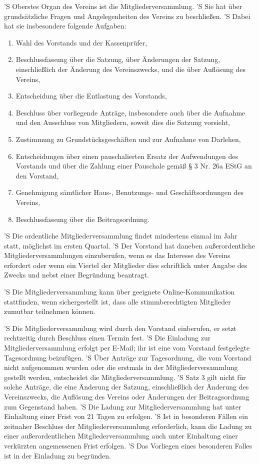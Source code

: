 \documentclass[a4paper,10pt]{scrreprt}
\begin{document}
\begin{contract}

'S Oberstes Organ des Vereins ist die Mitgliederversammlung.
'S Sie hat über grundsätzliche Fragen und Angelegenheiten des Vereins zu
beschließen.
'S Dabei hat sie insbesondere folgende Aufgaben:
\begin{enumerate}
	\item Wahl des Vorstands und der Kassenprüfer,
	\item Beschlussfassung über die Satzung, über Änderungen der Satzung,
	      einschließlich der Änderung des Vereinszwecks, und die über
		  Auflösung des Vereins,
	\item Entscheidung über die Entlastung des Vorstands,
	\item Beschluss über vorliegende Anträge, insbesondere auch über die
	      Aufnahme und den Ausschluss von Mitgliedern, soweit dies die Satzung
		  vorsieht,
	\item Zustimmung zu Grundstücksgeschäften und zur Aufnahme von Darlehen,
	\item Entscheidungen über einen pauschalierten Ersatz der Aufwendungen des
	      Vorstands und über die Zahlung einer Pauschale gemäß § 3 Nr. 26a EStG
		  an den Vorstand,
	\item Genehmigung sämtlicher Haus-, Benutzungs- und Geschäftsordnungen des
	      Vereins,
	\item Beschlussfassung über die Beitragsordnung.
\end{enumerate}

'S Die ordentliche Mitgliederversammlung findet mindestens einmal im Jahr
statt, möglichst im ersten Quartal.
'S Der Vorstand hat daneben außerordentliche Mitgliederversammlungen
einzuberufen, wenn es das Interesse des Vereins erfordert oder wenn ein Viertel
der Mitglieder dies schriftlich unter Angabe des Zwecks und nebst einer
Begründung beantragt.

'S Die Mitgliederversammlung kann über geeignete Online-Kommunikation
stattfinden, wenn sichergestellt ist, dass alle stimmberechtigten Mitglieder
zumutbar teilnehmen können.

'S Die Mitgliederversammlung wird durch den Vorstand einberufen, er setzt
rechtzeitig durch Beschluss einen Termin fest.
'S Die Einladung zur Mitgliederversammlung erfolgt per E-Mail; ihr ist eine vom
Vorstand festgelegte Tagesordnung beizufügen.
'S Über Anträge zur Tagesordnung, die vom Vorstand nicht aufgenommen wurden
oder die erstmals in der Mitgliederversammlung gestellt werden, entscheidet die
Mitgliederversammlung.
'S Satz 3 gilt nicht für solche Anträge, die eine Änderung der Satzung,
einschließlich der Änderung des Vereinszwecks, die Auflösung des Vereins oder
Änderungen der Beitragsordnung zum Gegenstand haben.
'S Die Ladung zur Mitgliederversammlung hat unter Einhaltung einer Frist von 21
Tagen zu erfolgen.
'S Ist in besonderen Fällen ein zeitnaher Beschluss der Mitgliederversammlung
erforderlich, kann die Ladung zu einer außerordentlichen Mitgliederversammlung
auch unter Einhaltung einer verkürzten angemessenen Frist erfolgen.
'S Das Vorliegen eines besonderen Falles ist in der Einladung zu begründen.


\end{contract}
\end{document}
